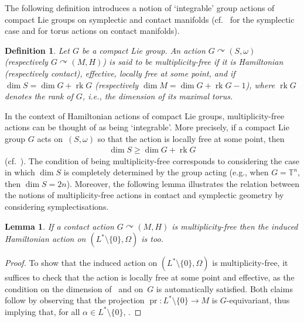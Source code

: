 \documentclass[pdftex]{sigma}
\numberwithin{equation}{section}
\newtheorem{Lemma}[Theorem]{Lemma}
\newtheorem{Definition}[Theorem]{Definition}
\newcommand{\CM}{(M,H)} %
\newcommand{\SM}{(S,\omega)} %
\newcommand{\SYM}{L^* \setminus \{0\}} %
\begin{document}
The following def\/inition introduces a notion of `integrable' group actions of compact Lie groups on symplectic and contact manifolds (cf.\ \cite[Def\/inition 5.1.11]{gui_sja} for the symplectic case and \cite[Def\/inition~2.11]{lerman_contact_toric} for torus actions on contact manifolds).

\begin{Definition}\label{defn:mult_free}
Let $G$ be a compact Lie group. An action $G \curvearrowright \SM$ (respectively $G \curvearrowright \CM$) is said to be {\it multiplicity-free} if it is Hamiltonian (respectively contact), ef\/fective, locally free at some point, and if $\dim S = \dim G + \operatorname{rk} G$ (respectively $ \dim M = \dim G + \operatorname{rk} G - 1$), where $\operatorname{rk} G$ denotes the rank of $G$, i.e., the dimension of its maximal torus.
\end{Definition}

In the context of Hamiltonian actions of compact Lie groups, multiplicity-free actions can be thought of as being `integrable'. More precisely, if a compact Lie group $G$ acts on~$\SM$ so that the action is locally free at some point, then
\begin{gather*}
 \dim S \geq \dim G + \operatorname{rk} G
\end{gather*}
(cf.\ \cite[Theorem~5.1.6]{gui_sja}). The condition of being multiplicity-free corresponds to considering the case in which $\dim S$ is completely determined by the group acting (e.g., when $G = \mathbb{T}^n$, then $\dim S = 2n$). Moreover, the following lemma illustrates the relation between the notions of multiplicity-free actions in contact and symplectic geometry by considering symplectisations.

\begin{Lemma}\label{prop:lift}
If a contact action $G \curvearrowright \CM$ is multiplicity-free then the induced Hamiltonian action on $(\SYM,\Omega)$ is too.
\end{Lemma}

\begin{proof} To show that the induced action on $(\SYM,\Omega)$ is multiplicity-free, it suf\/f\/ices to check that the action is locally free at some point and ef\/fective, as the condition on the dimension of~\smash{$\SYM$} and on~$G$ is automatically satisf\/ied. Both claims follow by observing that the projection $\operatorname{pr} \colon \SYM \to M$ is $G$-equivariant, thus implying that, for all $\alpha \in \SYM$, .
\end{proof}
\end{document}
